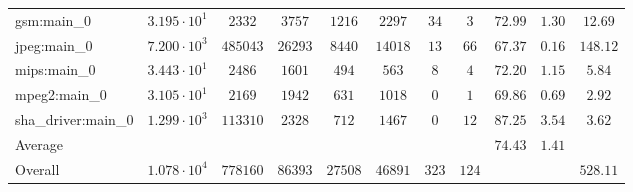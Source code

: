\begin{tabular}{|l|c|c|c|c|c|c|c|c|c|c|}
gsm:main\_0             & $ 3.195 \cdot 10^{1} $ & $ 2332   $ & $ 3757  $ & $ 1216  $ & $ 2297  $ & $ 34  $ & $ 3   $ & $ 72.99       $ & $ 1.30    $ & $ 12.69   $ \\
jpeg:main\_0            & $ 7.200 \cdot 10^{3} $ & $ 485043 $ & $ 26293 $ & $ 8440  $ & $ 14018 $ & $ 13  $ & $ 66  $ & $ 67.37       $ & $ 0.16    $ & $ 148.12  $ \\
mips:main\_0            & $ 3.443 \cdot 10^{1} $ & $ 2486   $ & $ 1601  $ & $ 494   $ & $ 563   $ & $ 8   $ & $ 4   $ & $ 72.20       $ & $ 1.15    $ & $ 5.84    $ \\
mpeg2:main\_0           & $ 3.105 \cdot 10^{1} $ & $ 2169   $ & $ 1942  $ & $ 631   $ & $ 1018  $ & $ 0   $ & $ 1   $ & $ 69.86       $ & $ 0.69    $ & $ 2.92    $ \\
sha\_driver:main\_0     & $ 1.299 \cdot 10^{3} $ & $ 113310 $ & $ 2328  $ & $ 712   $ & $ 1467  $ & $ 0   $ & $ 12  $ & $ 87.25       $ & $ 3.54    $ & $ 3.62    $ \\
\hline
Average                 & $                    $ & $        $ & $       $ & $       $ & $       $ & $     $ & $     $ & $ 74.43       $ & $ 1.41    $ & $         $ \\
\hline
Overall                 & $ 1.078 \cdot 10^{4} $ & $ 778160 $ & $ 86393 $ & $ 27508 $ & $ 46891 $ & $ 323 $ & $ 124 $ & $             $ & $         $ & $ 528.11  $ \\
\hline
\end{tabular}
